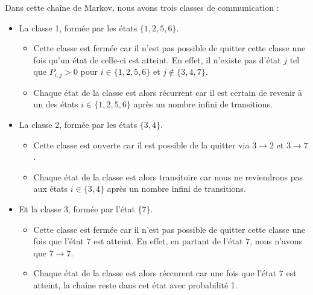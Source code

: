 \documentclass{article}
\begin{document}
\begin{tcolorbox}[colback=white,colframe=yellow!80!black,title=Exemple, breakable]
\begin{center}
\end{center}

Dans cette chaîne de Markov, nous avons trois classes de communication :
\begin{itemize}
    \item La classe 1, formée par les états $\{1, 2, 5, 6\}$.
    \begin{itemize}
        \item Cette classe est fermée car il n'est pas possible de quitter cette classe une fois qu'un état de celle-ci est atteint. En effet, il n'existe pas d'état $j$ tel que $P_{i,j} > 0$ pour $i \in \{1, 2, 5, 6\}$ et $j \notin \{3, 4, 7\}$.
\newpage %
        \item Chaque état de la classe est alors récurrent car il est certain de revenir à un des états $i \in \{1, 2, 5, 6\}$ après un nombre infini de transitions.
    \end{itemize}
    \item La classe 2, formée par les états $\{3, 4\}$.
    \begin{itemize}
        \item Cette classe est ouverte car il est possible de la quitter via $3 \to 2$ et $3 \to 7$.
        \item Chaque état de la classe est alors transitoire car nous ne reviendrons pas aux états $i \in \{3, 4\}$ après un nombre infini de transitions.
    \end{itemize}
    \item Et la classe 3, formée par l'état $\{7\}$.
    \begin{itemize}
        \item Cette classe est fermée car il n'est pas possible de quitter cette classe une fois que l'état $7$ est atteint. En effet, en partant de l'état $7$, nous n'avons que $7 \to 7$.
        \item Chaque état de la classe est alors réccurent car une fois que l'état $7$ est atteint, la chaîne reste dans cet état avec probabilité 1.
    \end{itemize}
\end{itemize}
\end{tcolorbox}
\end{document}
